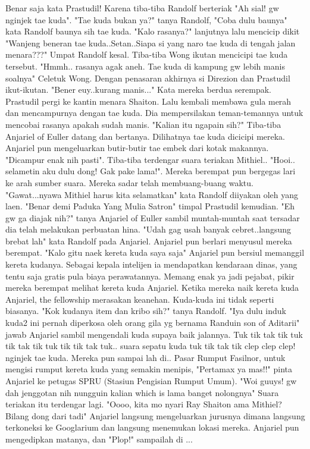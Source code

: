 \documentclass[a4paper,11pt,final]{article}
\begin{document}
Benar saja kata Prastudil! Karena tiba-tiba Randolf berteriak "Ah sial! gw nginjek tae kuda".
"Tae kuda bukan ya?" tanya Randolf, "Coba dulu baunya" kata Randolf baunya sih tae kuda. "Kalo rasanya?" lanjutnya lalu mencicip dikit "Wanjeng beneran tae kuda..Setan..Siapa si yang naro tae kuda di tengah jalan menara???" Umpat Randolf kesal.
Tiba-tiba Wong ikutan mencicipi tae kuda tersebut. "Hmmh.. rasanya agak aneh. Tae kuda di kampung gw lebih manis soalnya" Celetuk Wong.
Dengan penasaran akhirnya si Direzion dan Prastudil ikut-ikutan. "Bener euy..kurang manis..." Kata mereka berdua serempak.
Prastudil pergi ke kantin menara Shaiton. Lalu kembali membawa gula merah dan mencampurnya dengan tae kuda. Dia mempersilakan teman-temannya untuk mencobai rasanya apakah sudah manis.
"Kalian itu ngapain sih?" Tiba-tiba Anjariel of Euller datang dan bertanya.
Dilihatnya tae kuda dicicipi mereka. Anjariel pun mengeluarkan butir-butir tae embek dari kotak makannya. "Dicampur enak nih pasti". Tiba-tiba terdengar suara teriakan Mithiel..
"Hooi.. selametin aku dulu dong! Gak pake lama!".
Mereka berempat pun bergegas lari ke arah sumber suara. Mereka sadar telah membuang-buang waktu. "Gawat...nyawa Mithiel harus kita selamatkan" kata Randolf diiyakan oleh yang laen. "Benar demi Paduka Yang Mulia Satron" timpal Prastudil kemudian.
"Eh gw ga diajak nih?" tanya Anjariel of Euller sambil muntah-muntah saat tersadar dia telah melakukan perbuatan hina.
"Udah gag usah banyak cebret..langsung brebat lah" kata Randolf pada Anjariel. Anjariel pun berlari menyusul mereka berempat.
"Kalo gitu naek kereta kuda saya saja" Anjariel pun bersiul memanggil kereta kudanya. Sebagai kepala intelijen ia mendapatkan kendaraan dinas, yang tentu saja gratis pula biaya perawatannya.
Memang enak ya jadi pejabat, pikir mereka berempat melihat kereta kuda Anjariel.
Ketika mereka naik kereta kuda Anjariel, the fellowship merasakan keanehan. Kuda-kuda ini tidak seperti biasanya.
"Kok kudanya item dan kribo sih?" tanya Randolf. "Iya dulu induk kuda2 ini pernah diperkosa oleh orang gila yg bernama Randuin son of Aditarii" jawab Anjariel sambil mengendali kuda supaya baik jalannya.
Tuk tik tak tik tuk tik tak tik tuk tik tik tak tuk.. suara sepatu kuda tuk tik tak tik clep clep clep! nginjek tae kuda. Mereka pun sampai lah di..
Pasar Rumput Fasilnor, untuk mengisi rumput kereta kuda yang semakin menipis, "Pertamax ya mas!!" pinta Anjariel ke petugas SPRU (Stasiun Pengisian Rumput Umum).
"Woi guuys! gw dah jenggotan nih nungguin kalian which is lama banget nolongnya" Suara teriakan itu terdengar lagi.
"Oooo, kita mo nyari Ray Shaiton ama Mithiel? Bilang dong dari tadi" Anjariel langsung mengeluarkan jurusnya dimana langsung terkoneksi ke Googlarium dan langsung menemukan lokasi mereka. Anjariel pun mengedipkan matanya, dan "Plop!" sampailah di ...
\end{document}
